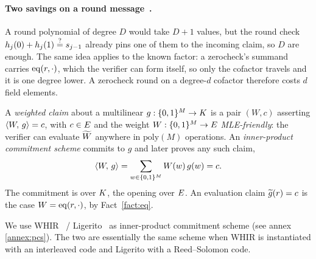 \paragraph{Two savings on a round message~\cite{Gru24}.} A round polynomial of degree $D$ would take $D+1$ values, but the round check $h_j(0)+h_j(1)\stackrel{?}{=} s_{j-1}$ already pins one of them to the incoming claim, so $D$ are enough. The same idea applies to the known factor: a zerocheck's summand carries $\operatorname{eq}(r,\cdot)$, which the verifier can form itself, so only the cofactor travels and it is one degree lower. A zerocheck round on a degree-$d$ cofactor therefore costs $d$ field elements.

\begin{definition}\label{def:ipcs}
A \emph{weighted claim} about a multilinear $g:\{0,1\}^{M}\to K$ is a pair $(W,c)$ asserting $\langle W,\, g \rangle=c$, with $c\in E$ and the weight $W:\{0,1\}^{M}\to E$ \emph{MLE-friendly}: the verifier can evaluate $\widetilde{W}$ anywhere in $\mathrm{poly}(M)$ operations. An \emph{inner-product commitment scheme} commits to $g$ and later proves any such claim,
\[
  \langle W,\, g \rangle=\sum_{w\in\{0,1\}^{M}}W(w)\,g(w)=c .
\]
The commitment is over $K$, the opening over $E$. An evaluation claim $\widetilde{g}(r)=c$ is the case $W=\operatorname{eq}(r,\cdot)$, by Fact~\ref{fact:eq}.
\end{definition}

We use WHIR~\cite{ACFY25} / Ligerito~\cite{NA25} as inner-product commitment scheme (see annex \ref{annex:pcs}). The two are essentially the same scheme when WHIR is instantiated with an interleaved code and Ligerito with a Reed--Solomon code.
